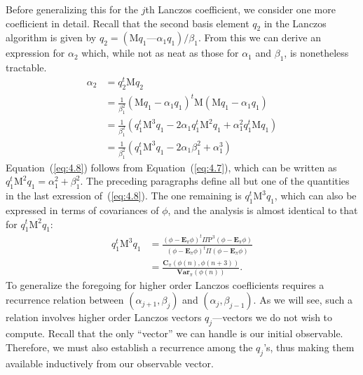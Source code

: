 \documentclass[12pt,letterpaper]{report}
\theoremstyle{plain}
\theoremstyle{definition}
\theoremstyle{remark}
\numberwithin{theorem}{chapter}
\numberwithin{claim}{chapter}
\numberwithin{equation}{chapter}
\numberwithin{conjecture}{chapter}
\newcommand\bC{\ensuremath{\mathbf{C}}}
\renewcommand\P{\ensuremath{\mathrm{P}}}
\newcommand\M{\ensuremath{\mathrm{M}}}
\newcommand\bE{\ensuremath{\mathbf{E}}}
\newcommand\Var{\ensuremath{\mathbf{Var}}}
\newcommand\<{\ensuremath{\langle}}
\renewcommand\>{\ensuremath{\rangle}}
\begin{document}
Before generalizing this for the $j$th Lanczos coefficient, we consider one more coeﬂicient
in detail. Recall that the second basis element $q_2$ in the Lanczos algorithm is given by 
$q_2 = (\M q_1 — \alpha_1 q_1)/\beta_1$. 
From this we can derive an expression for $\alpha_2$ which, while not as neat as those
%
%
%
%
for $\alpha_1$ and $\beta_1$, is nonetheless tractable.
\begin{align}
\label{eq:4.8}
\alpha_2 &= q_2^t \M q_2 \nonumber\\
&= \frac{1}{\beta_1^2}(\M q_1 - \alpha_1 q_1)^t\M (\M q_1 - \alpha_1 q_1)\nonumber\\
&= \frac{1}{\beta_1^2}(q_1^t\M^3 q_1 - 2\alpha_1 q_1^t\M^2 q_1 + \alpha_1^2q_1^t\M q_1 )\nonumber\\
&= \frac{1}{\beta_1^2}(q_1^t\M^3 q_1 - 2\alpha_1 \beta_1^2 + \alpha_1^3 )
\end{align}
Equation~(\ref{eq:4.8}) follows from Equation~(\ref{eq:4.7}), which can be
written as $q_1^t\M^2 q_1 = \alpha_1^2 + \beta_1^2$.  
The preceding paragraphs define all but one of the quantities in the last
exression of~(\ref{eq:4.8}). The one remaining
is $q_1^t\M^3 q_1$, which can also be expressed in terms of covariances of $\phi$,
and the analysis is almost identical to that for $q_1^t\M^2q_1$:
\begin{align*}
q_1^t\M^3 q_1  &= \frac{(\phi - \bE_\pi\phi)^t\Pi \P^3(\phi- \bE_\pi \phi)}
{(\phi - \bE_\pi\phi)^t\Pi (\phi- \bE_\pi \phi)} \\[8pt]
&= \frac{\bC_\pi (\phi(n), \phi(n + 3))}{\Var_\pi(\phi(n))}.
\end{align*}
To generalize the foregoing for higher order Lanczos coeﬂicients requires a recurrence
relation between $(\alpha_{j+1}, \beta_j)$ and $(\alpha_{j}, \beta_{j-1})$. 
As we will see, such a relation involves higher order
Lanczos vectors $q_j$---vectors we do not wish to compute. Recall that the only ``vector'' we can
handle is our initial observable. Therefore, we must also establish a recurrence
among the $q_j$'s, thus making them available inductively from our observable vector.
\end{document}

